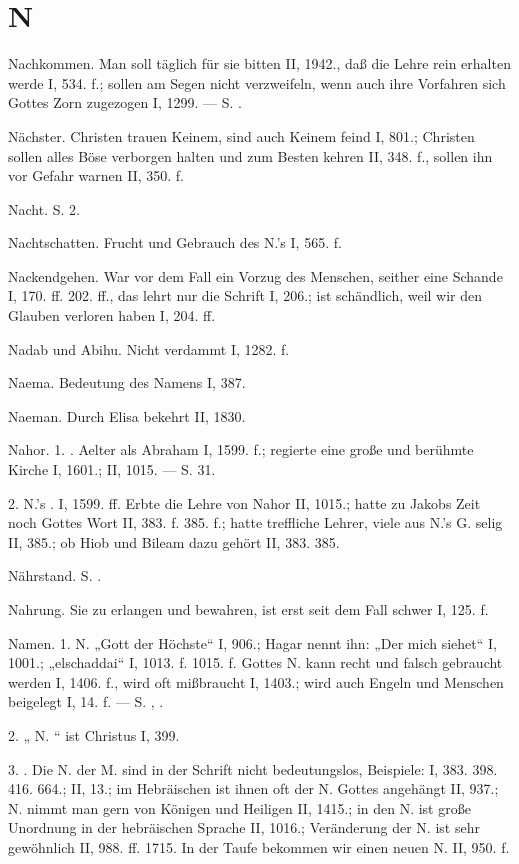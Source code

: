\section{N}

Nachkommen. Man soll täglich für sie bitten II, 1942., daß die Lehre rein erhalten werde I, 534. f.; sollen am Segen nicht verzweifeln, wenn auch ihre Vorfahren sich Gottes Zorn zugezogen I, 1299. — S. .

Nächster. Christen trauen Keinem, sind auch Keinem feind I, 801.; Christen sollen alles Böse verborgen halten und zum Besten kehren II, 348. f., sollen ihn vor Gefahr warnen II, 350. f.

Nacht. S.  2.

Nachtschatten. Frucht und Gebrauch des N.’s I, 565. f.

Nackendgehen. War vor dem Fall ein Vorzug des Menschen, seither eine Schande I, 170. ff. 202. ff., das lehrt nur die Schrift I, 206.; ist schändlich, weil wir den Glauben verloren haben I, 204. ff.

Nadab und Abihu. Nicht verdammt I, 1282. f.

Naema. Bedeutung des Namens I, 387.

Naeman. Durch Elisa bekehrt II, 1830.

Nahor. 1. . Aelter als Abraham I, 1599. f.; regierte eine große und berühmte Kirche I, 1601.; II, 1015. — S.  31.

2. N.’s . I, 1599. ff. Erbte die Lehre von Nahor II, 1015.; hatte zu Jakobs Zeit noch Gottes Wort II, 383. f. 385. f.; hatte treffliche Lehrer, viele aus N.’s G. selig II, 385.; ob Hiob und Bileam dazu gehört II, 383. 385.

Nährstand. S. .

Nahrung. Sie zu erlangen und bewahren, ist erst seit dem Fall schwer I, 125. f.

Namen. 1.  N. „Gott der Höchste“ I, 906.; Hagar nennt ihn: „Der mich siehet“ I, 1001.; „elschaddai“ I, 1013. f. 1015. f. Gottes N. kann recht und falsch gebraucht werden I, 1406. f., wird oft mißbraucht I, 1403.; wird auch Engeln und Menschen beigelegt I, 14. f. — S. , .

2. „ N. “ ist Christus I, 399.

3. . Die N. der M. sind in der Schrift nicht bedeutungslos, Beispiele: I, 383. 398. 416. 664.; II, 13.; im Hebräischen ist ihnen oft der N. Gottes angehängt II, 937.; N. nimmt man gern von Königen und Heiligen II, 1415.; in den N. ist große Unordnung in der hebräischen Sprache II, 1016.; Veränderung der N. ist sehr gewöhnlich II, 988. ff. 1715. In der Taufe bekommen wir einen neuen N. II, 950. f.

